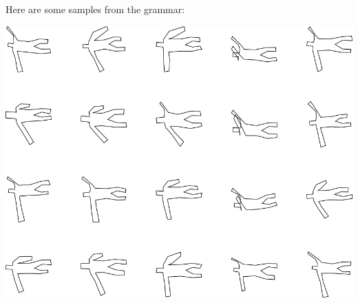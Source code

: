 Here are some samples from the grammar:

\includegraphics[width=6in]{output/3.learning/incremental/gram.6.d/samples.png}

